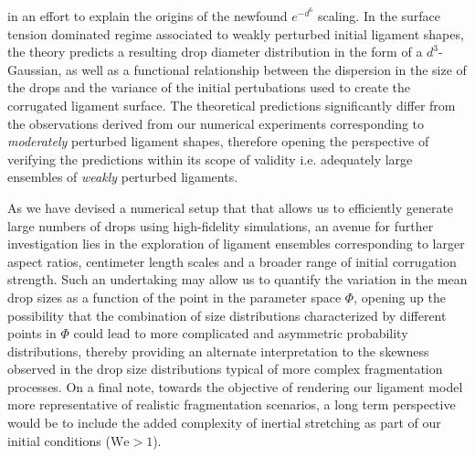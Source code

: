 in an effort to explain the origins of the newfound $e^{-d^6}$ scaling.
In the surface tension dominated regime associated to weakly perturbed initial ligament shapes, 
the theory predicts a resulting drop diameter distribution in the form of a $d^3$- Gaussian, 
as well as a functional relationship between the dispersion in the size of the drops and the 
variance of the initial pertubations used to create the corrugated ligament surface. 
The theoretical predictions significantly differ from the observations derived from our numerical experiments
corresponding to \textit{moderately} perturbed ligament shapes, therefore opening the perspective
of verifying the predictions within its scope of validity i.e. adequately large ensembles of \textit{weakly} perturbed ligaments.

As we have devised a numerical setup that that allows us to efficiently generate
large numbers of drops using high-fidelity simulations, an avenue for further investigation
lies in the exploration of ligament ensembles corresponding to 
larger aspect ratios, centimeter length scales and a broader range of initial corrugation strength. 
Such an undertaking may allow us to quantify the variation in the mean drop sizes as a function of the 
point in the parameter space $\Phi$, opening up the possibility that the combination of size distributions
characterized by different points in $\Phi$ could lead to more complicated and asymmetric probability
distributions, thereby providing an alternate interpretation to the skewness observed in the drop size 
distributions typical of more complex fragmentation processes. 
On a final note, towards the objective of rendering our ligament model more representative of  
realistic fragmentation scenarios, a long term perspective would be to include the added complexity
of inertial stretching as part of our initial conditions ($\textrm{We} > 1$).  
